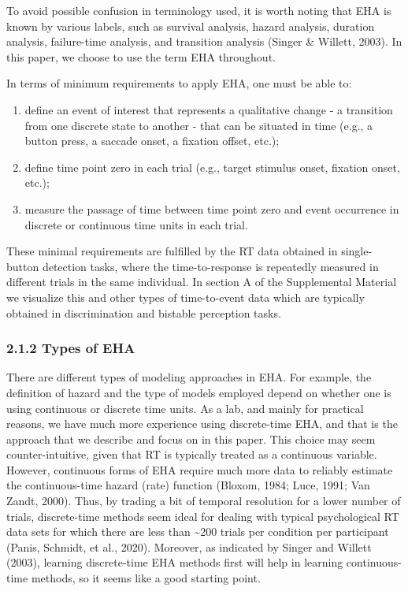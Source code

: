 \documentclass[
  man, donotrepeattitle,floatsintext]{apa6}
\begin{document}
To avoid possible confusion in terminology used, it is worth noting that EHA is known by various labels, such as survival analysis, hazard analysis, duration analysis, failure-time analysis, and transition analysis (Singer \& Willett, 2003). In this paper, we choose to use the term EHA throughout.

In terms of minimum requirements to apply EHA, one must be able to:

\begin{enumerate}
\def\labelenumi{\arabic{enumi}.}
\item
  define an event of interest that represents a qualitative change - a transition from one discrete state to another - that can be situated in time (e.g., a button press, a saccade onset, a fixation offset, etc.);
\item
  define time point zero in each trial (e.g., target stimulus onset, fixation onset, etc.);
\item
  measure the passage of time between time point zero and event occurrence in discrete or continuous time units in each trial.
\end{enumerate}

These minimal requirements are fulfilled by the RT data obtained in single-button detection tasks, where the time-to-response is repeatedly measured in different trials in the same individual. In section A of the Supplemental Material we visualize this and other types of time-to-event data which are typically obtained in discrimination and bistable perception tasks.

\subsubsection{2.1.2 Types of EHA}\label{types-of-eha}

There are different types of modeling approaches in EHA.
For example, the definition of hazard and the type of models employed depend on whether one is using continuous or discrete time units.
As a lab, and mainly for practical reasons, we have much more experience using discrete-time EHA, and that is the approach that we describe and focus on in this paper.
This choice may seem counter-intuitive, given that RT is typically treated as a continuous variable.
However, continuous forms of EHA require much more data to reliably estimate the continuous-time hazard (rate) function (Bloxom, 1984; Luce, 1991; Van Zandt, 2000).
Thus, by trading a bit of temporal resolution for a lower number of trials, discrete-time methods seem ideal for dealing with typical psychological RT data sets for which there are less than \textasciitilde200 trials per condition per participant (Panis, Schmidt, et al., 2020).
Moreover, as indicated by Singer and Willett (2003), learning discrete-time EHA methods first will help in learning continuous-time methods, so it seems like a good starting point.
\end{document}

